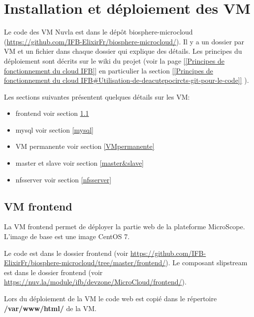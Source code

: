 \section {Installation et déploiement des VM}

Le code des VM Nuvla est dans le dépôt biosphere-microcloud (\url{https://github.com/IFB-ElixirFr/biosphere-microcloud/}).
Il y a un dossier par VM et un fichier  dans chaque dossier qui explique des détails.
Les principes du déploiement sont décrits sur le wiki du projet (voir la page
\href{https://intranet.genoscope.cns.fr/agc/redmine/projects/microcloud/wiki/Principes_de_fonctionnement_du_cloud_IFB}
{[[Principes de fonctionnement du cloud IFB]]}
en particulier la section
\href{https://intranet.genoscope.cns.fr/agc/redmine/projects/microcloud/wiki/Principes_de_fonctionnement_du_cloud_IFB#Utilisation-de-deacutepocircts-git-pour-le-code}
{[[Principes de fonctionnement du cloud IFB\#Utilisation-de-deacutepocircts-git-pour-le-code]]}
).

Les sections suivantes présentent quelques détails sur les VM:
\begin{itemize}
    \item frontend voir section \ref{frontend}
    \item mysql voir section \ref{mysql}
    \item VM permanente voir section \ref{VMpermanente}
    \item master et slave voir section \ref{master&slave}
    \item nfsserver voir section \ref{nfsserver}
\end{itemize}
\bigskip

\subsection {VM frontend}\label{frontend}


La VM frontend permet de déployer la partie web de la plateforme MicroScope.
L'image de base est une image CentOS 7.

Le code est dans le dossier frontend (voir \url{https://github.com/IFB-ElixirFr/biosphere-microcloud/tree/master/frontend/}).
Le composant slipstream est dans le dossier frontend (voir \url{https://nuv.la/module/ifb/devzone/MicroCloud/frontend/}).
\bigskip

Lors du déploiement de la VM le code web est copié dans le répertoire \textbf{/var/www/html/} de la VM.
\bigskip

